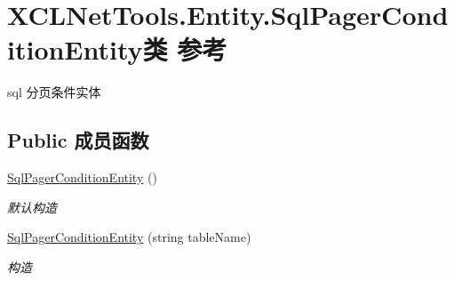 \hypertarget{class_x_c_l_net_tools_1_1_entity_1_1_sql_pager_condition_entity}{}\section{X\+C\+L\+Net\+Tools.\+Entity.\+Sql\+Pager\+Condition\+Entity类 参考}
\label{class_x_c_l_net_tools_1_1_entity_1_1_sql_pager_condition_entity}


sql 分页条件实体  


\subsection*{Public 成员函数}
\begin{DoxyCompactItemize}
\item 
\hyperlink{class_x_c_l_net_tools_1_1_entity_1_1_sql_pager_condition_entity_a8b6d71348a2cbfd9f609215a9d1af699}{Sql\+Pager\+Condition\+Entity} ()
\begin{DoxyCompactList}\small\item\em 默认构造 \end{DoxyCompactList}\item 
\hyperlink{class_x_c_l_net_tools_1_1_entity_1_1_sql_pager_condition_entity_a567e636eb71d4281f260cad017707cc9}{Sql\+Pager\+Condition\+Entity} (string table\+Name)
\begin{DoxyCompactList}\small\item\em 构造 \end{DoxyCompactList}\end{DoxyCompactItemize}
